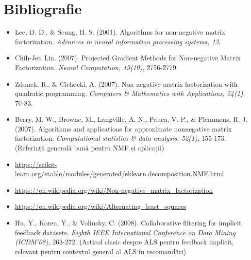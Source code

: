 \documentclass[12pt,a4paper]{article}
\begin{document}
	\section{Bibliografie}
	\begin{itemize}
		\item Lee, D. D., \& Seung, H. S. (2001). Algorithms for non-negative matrix factorization. \textit{Advances in neural information processing systems, 13}.
		\item Chih-Jen Lin. (2007). Projected Gradient Methods for Non-negative Matrix Factorization. \textit{Neural Computation, 19(10)}, 2756-2779.
		\item Zdunek, R., \& Cichocki, A. (2007). Non-negative matrix factorization with quadratic programming. \textit{Computers \& Mathematics with Applications, 54(1)}, 70-83.
		\item Berry, M. W., Browne, M., Langville, A. N., Pauca, V. P., \& Plemmons, R. J. (2007). Algorithms and applications for approximate nonnegative matrix factorization. \textit{Computational statistics \& data analysis, 52(1)}, 155-173. (Referință generală bună pentru NMF și aplicații)
		\item \url{https://scikit-learn.org/stable/modules/generated/sklearn.decomposition.NMF.html}
		\item \url{https://en.wikipedia.org/wiki/Non-negative_matrix_factorization}
		\item \url{https://en.wikipedia.org/wiki/Alternating_least_squares}
		\item Hu, Y., Koren, Y., \& Volinsky, C. (2008). Collaborative filtering for implicit feedback datasets. \textit{Eighth IEEE International Conference on Data Mining (ICDM'08)}, 263-272. (Articol clasic despre ALS pentru feedback implicit, relevant pentru contextul general al ALS în recomandări)
	\end{itemize}
	
\end{document}
